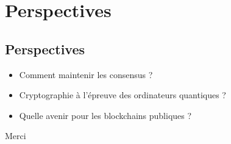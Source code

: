 \documentclass[presentation]{beamer}
\begin{document}
\section{Perspectives}
\label{sec:orgec75651}
\subsection{Perspectives}
\label{sec:org4dd5a07}
\begin{frame}[label={sec:org6c58303}]{}
\begin{itemize}
\item Comment maintenir les consensus ?
\item Cryptographie à l'épreuve des ordinateurs quantiques ?
\item Quelle avenir pour les blockchains publiques ?
\end{itemize}
\end{frame}
\begin{frame}[label={sec:org3d009df}]{}
\begin{block}{Merci}
{
  \frame[plain]{
  }
}
\end{block}
\end{frame}
\end{document}
